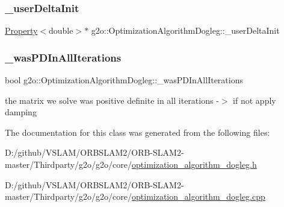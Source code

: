 \subsubsection{\texorpdfstring{\+\_\+user\+Delta\+Init}{\_userDeltaInit}}
{\footnotesize\ttfamily \mbox{\hyperlink{classg2o_1_1_property}{Property}}$<$double$>$$\ast$ g2o\+::\+Optimization\+Algorithm\+Dogleg\+::\+\_\+user\+Delta\+Init\hspace{0.3cm}{\ttfamily [protected]}}

\mbox{\label{classg2o_1_1_optimization_algorithm_dogleg_af921ebbebaf059f73e410fc751616ec2}} 
\subsubsection{\texorpdfstring{\+\_\+was\+P\+D\+In\+All\+Iterations}{\_wasPDInAllIterations}}
{\footnotesize\ttfamily bool g2o\+::\+Optimization\+Algorithm\+Dogleg\+::\+\_\+was\+P\+D\+In\+All\+Iterations\hspace{0.3cm}{\ttfamily [protected]}}



the matrix we solve was positive definite in all iterations -\/$>$ if not apply damping 



The documentation for this class was generated from the following files\+:\begin{DoxyCompactItemize}
\item 
D\+:/github/\+V\+S\+L\+A\+M/\+O\+R\+B\+S\+L\+A\+M2/\+O\+R\+B-\/\+S\+L\+A\+M2-\/master/\+Thirdparty/g2o/g2o/core/\mbox{\hyperlink{optimization__algorithm__dogleg_8h}{optimization\+\_\+algorithm\+\_\+dogleg.\+h}}\item 
D\+:/github/\+V\+S\+L\+A\+M/\+O\+R\+B\+S\+L\+A\+M2/\+O\+R\+B-\/\+S\+L\+A\+M2-\/master/\+Thirdparty/g2o/g2o/core/\mbox{\hyperlink{optimization__algorithm__dogleg_8cpp}{optimization\+\_\+algorithm\+\_\+dogleg.\+cpp}}\end{DoxyCompactItemize}
